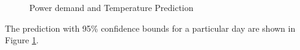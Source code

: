\begin{figure}
	\caption{Power demand and Temperature Prediction}
	\label{F:prediction}
\end{figure}
The prediction with 95\% confidence bounds for a particular day are shown in Figure \ref{F:prediction}.
